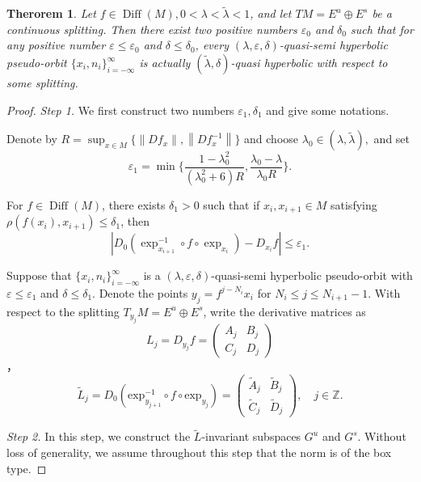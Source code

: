 \documentclass[12pt]{article}
\newtheorem{theorem}{Therorem}[section]
\begin{document}
\begin{theorem}\label{th:2.1}
	Let $f \in \operatorname{Diff}(M),0 < \lambda < \widetilde{\lambda} < 1 $, and let $TM=E^u \oplus E^s$ be a continuous splitting. Then there exist two positive numbers $\varepsilon_0$ and $\delta_0$ such that for any positive number $\varepsilon\leqslant\varepsilon_0 $ and $\delta\leqslant\delta_0$, every $(\lambda,\varepsilon,\delta)$-quasi-semi hyperbolic pseudo-orbit $ \{x_{i},n_{i}\}_{i=-\infty}^{\infty} $ is actually  $(\widetilde{\lambda},\delta)$-quasi hyperbolic with respect to some splitting.
\end{theorem}
\begin{proof}{\em Step 1.} We first construct two numbers $\varepsilon_1,\delta_1$ and give some notations. 
	
	Denote by $ R=\sup_{x\in M}\{\left\|Df_{x}\right\|,\left\|Df_{x}^{-1}\right\|\} $ and choose $\lambda_{0}\in(\lambda,\widetilde{\lambda}), $ and set 
	$$
	\varepsilon_1=\min\{\frac{1-\lambda_{0}^{2}}{(\lambda_{0}^{2}+6)R},\frac{\lambda_{0}-\lambda}{\lambda_{0}R}\}.
	$$
	
	For $f \in \operatorname{Diff}(M)$, there exists $\delta_1 > 0$ such that if $x_i,x_{i+1} \in M$ satisfying $\rho(f(x_i), x_{i+1}) \leqslant \delta_1$, then\begin{equation}\label{2.2}|D_0(\exp_{x_{i+1}}^{-1} \circ f \circ \exp_{x_i}) - D_{x_i}f| \leqslant \varepsilon_1.\end{equation}
	
	Suppose that $ \{x_{i},n_{i}\}_{i=-\infty}^{\infty} $ is a $ (\lambda,\varepsilon,\delta) $-quasi-semi hyperbolic pseudo-orbit with $ \varepsilon\leqslant\varepsilon_1 $ and $ \delta\leqslant\delta_1 $. Denote the points $  y_{j}=f^{j-N_{i}}x_{i}$ for $ N_{i}\leqslant j\leqslant N_{i+1}-1 .$ With respect to the splitting $ T_{y_{j}}M=E^{u} \oplus E^{s} $, write the derivative matrices as
	$$
	L_{j}=D_{y_{j}}f=
	\begin{pmatrix}
		A_{j}&B_{j}\\
		C_{j}&D_{j}
	\end{pmatrix}
	$$ 
	，
	$$
	\widetilde{L}_{j}=D_{0}(\text{exp}_{y_{j+1}}^{-1}\circ f \circ \text{exp}_{y_{j}})=
	\begin{pmatrix}
		\widetilde{A}_{j}&\widetilde{B}_{j}\\
		\widetilde{C}_{j}&\widetilde{D}_{j}
	\end{pmatrix},\quad j\in \mathbb Z.
	$$
	
	{\em Step 2.} In this step, we construct the $\widetilde{L}$-invariant subspaces $G^u $ and $G^s$. Without loss of generality, we assume throughout this step that the norm is of the  box type.
	

\end{proof}
\end{document}
